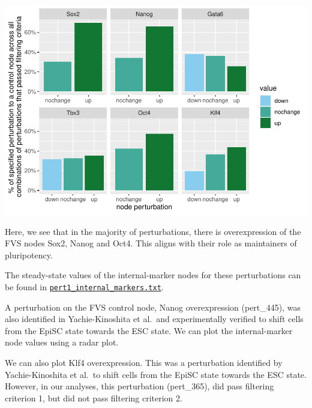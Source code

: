 \documentclass[
]{book}
\begin{document}
\begin{center}\includegraphics{_main_files/figure-latex/unnamed-chunk-30-1} \end{center}

Here, we see that in the majority of perturbations, there is overexpression of the FVS nodes Sox2, Nanog and Oct4. This aligns with their role as maintainers of pluripotency.

The steady-state values of the internal-marker nodes for these perturbations can be found in \href{https://github.com/VeraLiconaResearchGroup/Netisce/blob/main/ipsc_validation/results/pert1_internal_markers.txt}{\texttt{pert1\_internal\_markers.txt}}.

A perturbation on the FVS control node, Nanog overexpression (pert\_445), was also identified in Yachie-Kinoshita et al.~and experimentally verified to shift cells from the EpiSC state towards the ESC state. We can plot the internal-marker node values using a radar plot.

We can also plot Klf4 overexpression. This was a perturbation identified by Yachie-Kinoshita et al.~to shift cells from the EpiSC state towards the ESC state. However, in our analyses, this perturbation (pert\_365), did pass filtering criterion 1, but did not pass filtering criterion 2.
\end{document}
